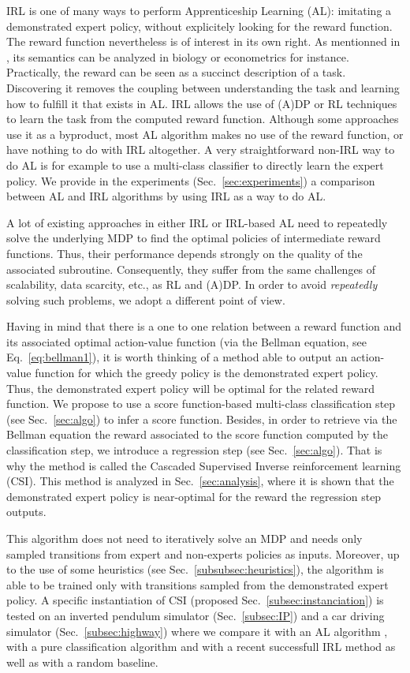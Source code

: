 \documentclass[smallextended]{svjour3}
\begin{document}
IRL is one of many ways to perform Apprenticeship Learning (AL): imitating a demonstrated expert policy, without explicitely looking for the reward function. The reward function nevertheless is of interest in its own right. As mentionned in \cite{russell1998learning}, its semantics can be analyzed in biology or econometrics for instance. Practically, the reward can be seen as a succinct description of a task. Discovering it removes the coupling between understanding the task and learning how to fulfill it that exists in AL. IRL allows the use of (A)DP or RL techniques to learn the task from the computed reward function. Although some approaches use it as a byproduct, most AL algorithm makes no use of the reward function, or have nothing to do with IRL altogether. A very straightforward non-IRL way to do AL is for example to use a multi-class classifier to directly learn the expert policy. We provide in the experiments (Sec.~\ref{sec:experiments}) a comparison between AL and IRL algorithms by using IRL as a way to do AL.

A lot of existing approaches in either IRL or IRL-based AL need to repeatedly solve the underlying MDP to find the optimal policies of intermediate reward functions. Thus, their performance depends strongly on the quality of the associated subroutine. Consequently, they suffer from the same challenges of scalability, data scarcity, etc., as RL and (A)DP. In order to avoid \emph{repeatedly} solving such problems, we adopt a different point of view.

Having in mind that there is a one to one relation between a reward function and its associated optimal action-value function (via the Bellman equation, see Eq.~\eqref{eq:bellman1}), it is worth thinking of a method able to output an action-value function for which the greedy policy is the demonstrated expert policy. Thus, the demonstrated expert policy will be optimal for the related reward function. We propose to use a score function-based multi-class classification step (see Sec.~\ref{sec:algo}) to infer a score function. Besides, in order to retrieve via the Bellman equation the reward associated to the score function computed by the classification step, we introduce a regression step (see Sec.~\ref{sec:algo}). That is why the method is called the Cascaded Supervised Inverse reinforcement learning (CSI). This method is analyzed in Sec.~\ref{sec:analysis}, where it is shown that the demonstrated expert policy is near-optimal for the reward the regression step outputs.

This algorithm does not need to iteratively solve an MDP and needs only sampled transitions from expert and non-experts policies as inputs. Moreover, up to the use of some heuristics (see Sec.~\ref{subsubsec:heuristics}), the algorithm is able to be trained only with transitions sampled from the demonstrated expert policy. A specific instantiation of CSI (proposed Sec.~\ref{subsec:instanciation}) is tested on an inverted pendulum simulator (Sec.~\ref{subsec:IP}) and a car driving simulator (Sec.~\ref{subsec:highway}) where we compare it with an AL algorithm \cite{abbeel2004apprenticeship}, with a pure classification algorithm \cite{taskar2005learning} and with a recent successfull IRL method \cite{klein2012scirl} as well as with a random baseline.
\end{document}
